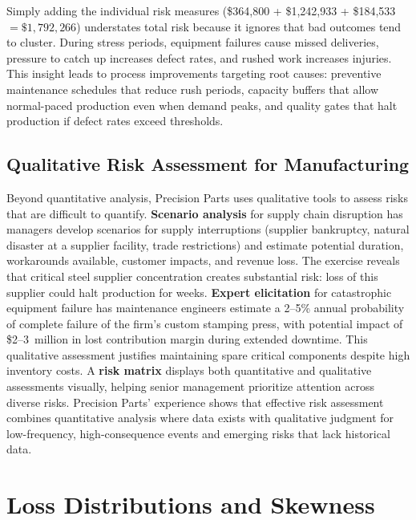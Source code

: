 \documentclass[11pt,openany]{book}
\begin{document}
Simply adding the individual risk measures (\$364,800 + \$1,242,933 + \$184,533
\(= \$1{,}792{,}266\)) understates total risk because it ignores that bad
outcomes tend to cluster. During stress periods, equipment failures cause missed
deliveries, pressure to catch up increases defect rates, and rushed work
increases injuries. This insight leads to process improvements targeting root
causes: preventive maintenance schedules that reduce rush periods, capacity
buffers that allow normal-paced production even when demand peaks, and quality
gates that halt production if defect rates exceed thresholds.

\subsection{Qualitative Risk Assessment for Manufacturing}
\label{subsec:precision-qualitative}

Beyond quantitative analysis, Precision Parts uses qualitative tools to assess
risks that are difficult to quantify. \textbf{Scenario analysis} for supply
chain disruption has managers develop scenarios for supply interruptions
(supplier bankruptcy, natural disaster at a supplier facility, trade
restrictions) and estimate potential duration, workarounds available, customer
impacts, and revenue loss. The exercise reveals that critical steel supplier
concentration creates substantial risk: loss of this supplier could halt
production for weeks. \textbf{Expert elicitation} for catastrophic equipment
failure has maintenance engineers estimate a 2--5\% annual probability of
complete failure of the firm's custom stamping press, with potential impact of
\$2--3~million in lost contribution margin during extended downtime. This
qualitative assessment justifies maintaining spare critical components despite
high inventory costs. A \textbf{risk matrix} displays both quantitative and
qualitative assessments visually, helping senior management prioritize attention
across diverse risks. Precision Parts' experience shows that effective risk
assessment combines quantitative analysis where data exists with qualitative
judgment for low-frequency, high-consequence events and emerging risks that
lack historical data.

\section{Loss Distributions and Skewness}
\label{sec:loss-distributions}
\end{document}
